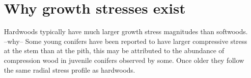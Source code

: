 \section{Why growth stresses exist}
Hardwoods typically have much larger growth stress magnitudes than softwoods.
--why-- \cite{barnett1981xylem} Some young conifers have been
reported to have larger compressive stress at the stem than at the pith,
this may be attributed to the abundance of compression wood in juvenile
conifers observed by some. Once older they follow the same radial stress profile
as hardwoods.